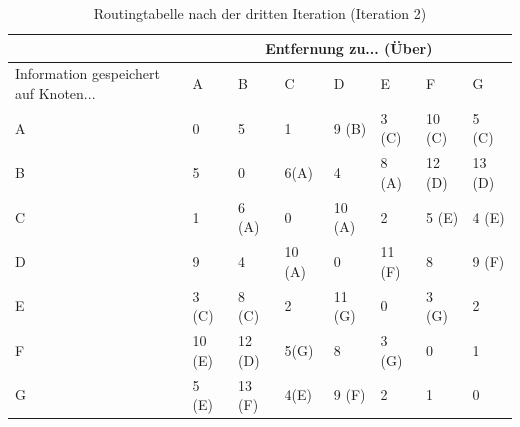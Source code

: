 \documentclass[12pt]{scrartcl}
\begin{document}
    \begin{table}[h]
        \centering
        \begin{tabularx}{\textwidth}{|p{2.75cm}|X|X|X|X|X|X|X|}\hline
            & \multicolumn{7}{c|}{Entfernung zu... (Über)} \\\hline
            Information gespeichert auf Knoten... 
                & A     & B     & C     & D     & E     & F     & G     \\\hline
            A   & 0     & 5     & 1     & 9 (B) & 3 (C) & 10 (C)& 5 (C) \\\hline
            B   & 5     & 0     & 6(A)  & 4     & 8 (A) & 12 (D)& 13 (D)\\\hline
            C   & 1     & 6 (A) & 0     & 10 (A)& 2     & 5 (E) & 4 (E) \\\hline
            D   & 9     & 4     & 10 (A)& 0     & 11 (F)& 8     & 9 (F) \\\hline
            E   & 3 (C) & 8 (C) & 2     & 11 (G)& 0     & 3 (G) & 2     \\\hline
            F   & 10 (E)& 12 (D)& 5(G)  & 8     & 3 (G) & 0     & 1     \\\hline
            G   & 5 (E) & 13 (F)& 4(E)  & 9 (F) & 2     & 1     & 0     \\\hline
        \end{tabularx}
        \caption{Routingtabelle nach der dritten Iteration (Iteration 2)}
    \end{table}

\end{document}
